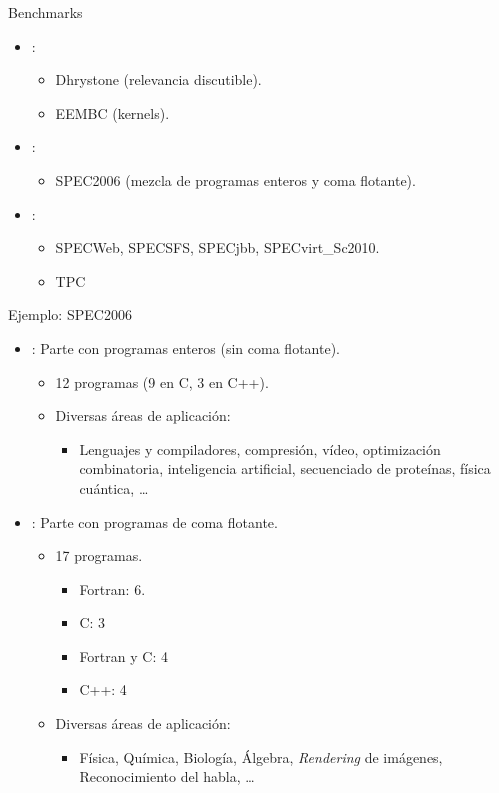\begin{frame}[t]{Benchmarks}
\begin{itemize}
  \item {}:
    \begin{itemize}
      \item Dhrystone (relevancia discutible).
      \item EEMBC (kernels).
    \end{itemize}
  \item {}:
    \begin{itemize}
      \item SPEC2006 (mezcla de programas enteros y coma flotante).
    \end{itemize}
  \item {}:
    \begin{itemize}
      \item SPECWeb, SPECSFS, SPECjbb, SPECvirt\_Sc2010.
      \item TPC
    \end{itemize}
\end{itemize}
\end{frame}

\begin{frame}[t]{Ejemplo: SPEC2006}
\begin{itemize}
  \item {}: Parte con programas enteros (sin coma flotante).
    \begin{itemize}
      \item 12 programas (9 en C, 3 en C++).
      \item Diversas áreas de aplicación:
        \begin{itemize}
          \item Lenguajes y compiladores, compresión, vídeo, optimización combinatoria,
                inteligencia artificial, secuenciado de proteínas, física cuántica, \ldots
        \end{itemize}
    \end{itemize}
  \item {}: Parte con programas de coma flotante.
    \begin{itemize}
      \item 17 programas.
        \begin{itemize}
          \item Fortran: 6.
          \item C: 3
          \item Fortran y C: 4
          \item C++: 4
        \end{itemize}
      \item Diversas áreas de aplicación:
        \begin{itemize}
          \item Física, Química, Biología, Álgebra, \emph{Rendering} de imágenes,
                Reconocimiento del habla, \ldots
        \end{itemize}
    \end{itemize}
\end{itemize}
\end{frame}
